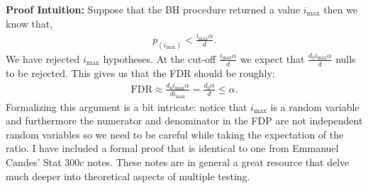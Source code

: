 \documentclass[twoside,12pt]{article}
\begin{document}
{\bf Proof Intuition: } Suppose that the BH procedure returned a value $i_{\max}$ then we know that,
\begin{align*}
p_{(i_{\max})} < \frac{i_{\max} \alpha}{d}.
\end{align*}
We have rejected $i_{\max}$ hypotheses. At the cut-off $\frac{i_{\max} \alpha}{d}$ we expect that $\frac{d_0 i_{\max} \alpha}{d}$ nulls to be rejected. This gives us that the FDR should be roughly:
\begin{align*}
\text{FDR} \approx \frac{d_0 i_{\max} \alpha}{d i_{\max}} =  \frac{d_0 \alpha}{d} \leq \alpha.
\end{align*}
Formalizing this argument is a bit intricate: notice that $i_{\max}$ is a random variable and furthermore the numerator and denominator in the FDP are not independent random variables so we need to be careful while taking the expectation of the ratio. I have included a formal proof that is identical to one from Emmanuel Candes' Stat 300c notes. These notes are in general a great resource that delve much deeper into theoretical aspects of multiple testing.
\end{document}
